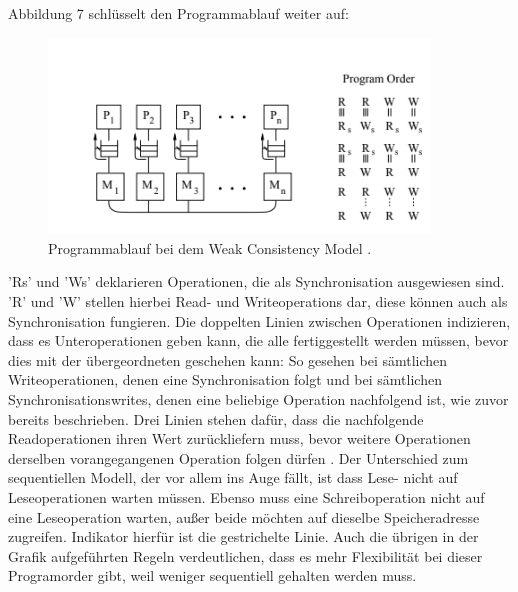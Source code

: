 \documentclass[final,bibliography=totocnumbered]{include/sikseminar}
\begin{document}
Abbildung 7 schlüsselt den Programmablauf weiter auf:
\begin{figure}[htbp] %
  \centering
  \includegraphics[width=0.9\textwidth]{figures/weeeea}
  \caption{Programmablauf bei dem Weak Consistency Model \cite{mcm3}.}
  \label{Fig:weak}
\end{figure}


 'Rs' und 'Ws' deklarieren Operationen, die als Synchronisation ausgewiesen sind. 'R' und 'W' stellen hierbei Read- und Writeoperations dar, diese können auch als Synchronisation fungieren.
Die doppelten Linien zwischen Operationen indizieren, dass es Unteroperationen geben kann, die alle fertiggestellt werden müssen,
bevor dies mit der übergeordneten geschehen kann: So gesehen bei sämtlichen Writeoperationen, denen eine Synchronisation folgt und bei sämtlichen 
Synchronisationswrites, denen eine beliebige Operation nachfolgend ist, wie zuvor bereits beschrieben.
Drei Linien stehen dafür, dass die nachfolgende Readoperationen ihren Wert zurückliefern muss, bevor weitere Operationen derselben vorangegangenen Operation folgen dürfen \cite{mcm3}.
Der Unterschied zum sequentiellen Modell, der vor allem ins Auge fällt, ist dass Lese- nicht auf Leseoperationen warten müssen. Ebenso muss eine Schreiboperation nicht auf eine Leseoperation warten, außer beide möchten auf dieselbe Speicheradresse zugreifen.
Indikator hierfür ist die gestrichelte Linie. Auch die übrigen in der Grafik aufgeführten Regeln verdeutlichen, dass es mehr Flexibilität bei dieser Programorder gibt, weil weniger sequentiell gehalten werden muss.
\end{document}
